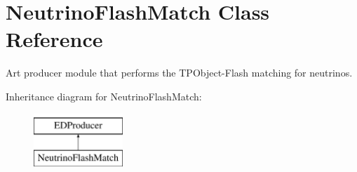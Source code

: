 \hypertarget{classNeutrinoFlashMatch}{\section{Neutrino\-Flash\-Match Class Reference}
\label{classNeutrinoFlashMatch}
}


Art producer module that performs the T\-P\-Object-\/\-Flash matching for neutrinos.  


Inheritance diagram for Neutrino\-Flash\-Match\-:\begin{figure}[H]
\begin{center}
\leavevmode
\includegraphics[height=2.000000cm]{classNeutrinoFlashMatch}
\end{center}
\end{figure}
